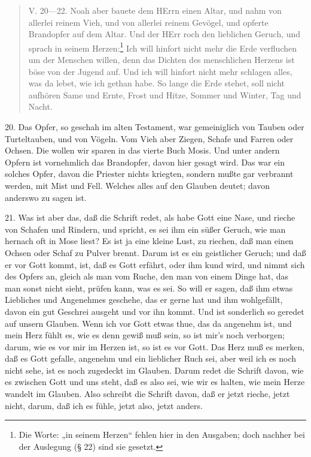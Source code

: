 \begin{quote}
V. 20—22. Noah aber bauete dem HErrn einen Altar, und nahm von allerlei reinem Vieh, und von allerlei reinem Gevögel, und opferte Brandopfer auf dem Altar. Und der HErr roch den lieblichen Geruch, und sprach in seinem Herzen:\footnote{Die Worte: „in seinem Herzen“ fehlen hier in den Ausgaben; doch nachher bei der Auslegung (§ 22) sind sie gesetzt.} Ich will hinfort nicht mehr die Erde verfluchen um der Menschen willen, denn das Dichten des menschlichen Herzens ist böse von der Jugend auf. Und ich will hinfort nicht mehr schlagen alles, was da lebet, wie ich gethan habe. So lange die Erde stehet, soll nicht aufhören Same und Ernte, Frost und Hitze, Sommer und Winter, Tag und Nacht.
\end{quote}

20. Das Opfer, so geschah im alten Testament, war gemeiniglich von Tauben oder Turteltauben, und von Vögeln. Vom Vieh aber Ziegen, Schafe und Farren oder Ochsen. Die wollen wir sparen in das vierte Buch Mosis. Und unter andern Opfern ist vornehmlich das Brandopfer, davon hier gesagt wird. Das war ein solches Opfer, davon die Priester nichts kriegten, sondern mußte gar verbrannt werden, mit Mist und Fell. Welches alles auf den Glauben deutet; davon anderswo zu sagen ist.

21. Was ist aber das, daß die Schrift redet, als habe Gott eine Nase, und rieche von Schafen und Rindern, und spricht, es sei ihm ein süßer Geruch, wie man hernach oft in Mose liest? Es ist ja eine kleine Lust, zu riechen, daß man einen Ochsen oder Schaf zu Pulver brennt. Darum ist es ein geistlicher Geruch; und daß er vor Gott kommt, ist, daß es Gott erfährt, oder ihm kund wird, und nimmt sich des Opfers an, gleich als man vom Ruche, den man von einem Dinge hat, das man sonst nicht sieht, prüfen kann, was es sei. So will er sagen, daß ihm etwas Liebliches und Angenehmes geschehe, das er gerne hat und ihm wohlgefällt, davon ein gut Geschrei ausgeht und vor ihn kommt. Und ist sonderlich so geredet auf unsern Glauben. Wenn ich vor Gott etwas thue, das da angenehm ist, und mein Herz fühlt es, wie es denn gewiß muß sein, so ist mir's noch verborgen; darum, wie es vor mir im Herzen ist, so ist es vor Gott. Das Herz muß es merken, daß es Gott gefalle, angenehm und ein lieblicher Ruch sei, aber weil ich es noch nicht sehe, ist es noch zugedeckt im Glauben. Darum redet die Schrift davon, wie es zwischen Gott und uns steht, daß es also sei, wie wir es halten, wie mein Herze wandelt im Glauben. Also schreibt die Schrift davon, daß er jetzt rieche, jetzt nicht, darum, daß ich es fühle, jetzt also, jetzt anders.

